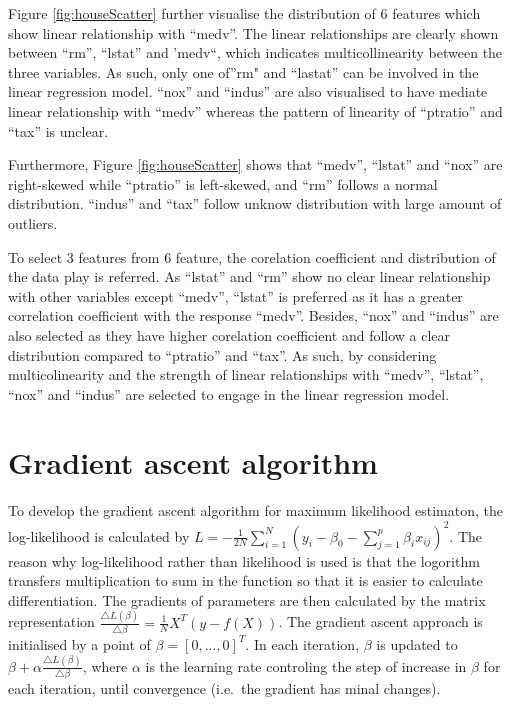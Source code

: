 \documentclass[letterpaper,12pt,twoside,]{pinp}
\begin{document}
Figure \ref{fig:houseScatter} further visualise the distribution of 6
features which show linear relationship with ``medv''. The linear
relationships are clearly shown between ``rm'', ``lstat'' and 'medv``,
which indicates multicollinearity between the three variables. As such,
only one of''rm" and ``lastat'' can be involved in the linear regression
model. ``nox'' and ``indus'' are also visualised to have mediate linear
relationship with ``medv'' whereas the pattern of linearity of
``ptratio'' and ``tax'' is unclear.

Furthermore, Figure \ref{fig:houseScatter} shows that ``medv'',
``lstat'' and ``nox'' are right-skewed while ``ptratio'' is left-skewed,
and ``rm'' follows a normal distribution. ``indus'' and ``tax'' follow
unknow distribution with large amount of outliers.

To select 3 features from 6 feature, the corelation coefficient and
distribution of the data play is referred. As ``lstat'' and ``rm'' show
no clear linear relationship with other variables except ``medv'',
``lstat'' is preferred as it has a greater correlation coefficient with
the response ``medv''. Besides, ``nox'' and ``indus'' are also selected
as they have higher corelation coefficient and follow a clear
distribution compared to ``ptratio'' and ``tax''. As such, by
considering multicolinearity and the strength of linear relationships
with ``medv'', ``lstat'', ``nox'' and ``indus'' are selected to engage
in the linear regression model.

\hypertarget{gradient-ascent-algorithm}{%
\section{Gradient ascent algorithm}\label{gradient-ascent-algorithm}}

To develop the gradient ascent algorithm for maximum likelihood
estimaton, the log-likelihood is calculated by
\(L=-\frac{1}{2N}\sum^N_{i=1}(y_i-\beta_0-\sum^p_{j=1}\beta_ix_{ij})^2\).
The reason why log-likelihood rather than likelihood is used is that the
logorithm transfers multiplication to sum in the function so that it is
easier to calculate differentiation. The gradients of parameters are
then calculated by the matrix representation
\(\frac{\bigtriangleup L(\beta)}{\bigtriangleup \beta}=\frac{1}{N}X^T(y-f(X))\).
The gradient ascent approach is initialised by a point of
\(\beta=[0,...,0]^T\). In each iteration, \(\beta\) is updated to
\(\beta+\alpha\frac{\bigtriangleup L(\beta)}{\bigtriangleup \beta}\),
where \(\alpha\) is the learning rate controling the step of increase in
\(\beta\) for each iteration, until convergence (i.e.~the gradient has
minal changes).
\end{document}
